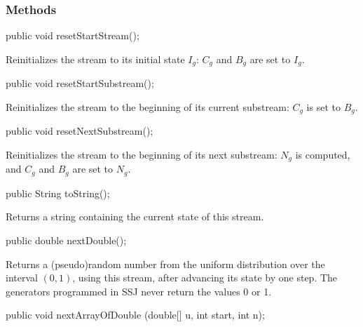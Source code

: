 \subsubsection* {Methods}
\begin{code}

   public void resetStartStream();
\end{code}
 \begin{tabb} Reinitializes the stream to its initial state $I_g$:
   $C_g$ and $B_g$ are set to $I_g$.
 \end{tabb}
\begin{code}

   public void resetStartSubstream();
\end{code}
 \begin{tabb} Reinitializes the stream to the beginning of its current
   substream: $C_g$ is set to $B_g$.
 \end{tabb}
\begin{code}

   public void resetNextSubstream();
\end{code}
 \begin{tabb} Reinitializes the stream to the beginning of its next
   substream: $N_g$ is computed, and
   $C_g$ and $B_g$ are set to $N_g$.
 \end{tabb}
\begin{code}

   public String toString();
\end{code}
  \begin{tabb} Returns a string containing the current state of this stream.
  \end{tabb}
\begin{htmlonly}
\end{htmlonly}
\begin{code}

   public double nextDouble();
\end{code}
  \begin{tabb} Returns a (pseudo)random number from the uniform distribution
   over the interval $(0,1)$, using this stream, after advancing its
   state by one step.  The generators programmed in SSJ never 
   return the values 0 or 1.
  \end{tabb}
\begin{htmlonly}
\end{htmlonly}
\begin{code}

   public void nextArrayOfDouble (double[] u, int start, int n);
\end{code}
